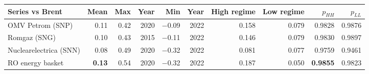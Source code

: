 \begin{tabular}{lrrrrrrrrr}
\toprule
Series vs Brent & Mean & Max & Year & Min & Year & High regime & Low regime & $p_{HH}$ & $p_{LL}$ \\
\midrule
OMV Petrom (SNP) & 0.11 & 0.42 & 2020 & $-$0.09 & 2022 & 0.158 & 0.079 & 0.9828 & 0.9876 \\
Romgaz (SNG) & 0.10 & 0.43 & 2015 & $-$0.11 & 2022 & 0.146 & 0.079 & 0.9830 & 0.9897 \\
Nuclearelectrica (SNN) & 0.08 & 0.49 & 2020 & $-$0.32 & 2022 & 0.081 & 0.077 & 0.9759 & 0.9461 \\
RO energy basket & \textbf{0.13} & 0.54 & 2020 & $-$0.32 & 2022 & 0.187 & 0.050 & \textbf{0.9855} & 0.9823 \\
\bottomrule
\end{tabular}
